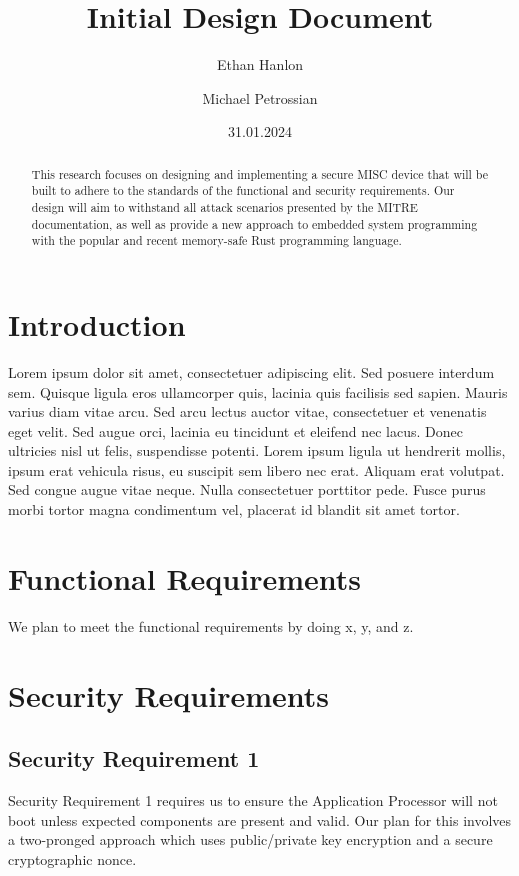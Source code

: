 \documentclass{prace}
\title{Initial Design Document}
\date{31.01.2024}
\author[1]{Ethan Hanlon}
\author[1]{Michael Petrossian}
\affiliation{San Francisco State University, 1600 Holloway Avenue, San Francisco, CA 94132, USA}
\begin{document}
\maketitle

\begin{abstract}
This research focuses on designing and implementing a secure MISC device that will be built to adhere to the standards of the functional and security requirements. Our design will 
aim to withstand all attack scenarios presented by the MITRE documentation, as well as provide a new approach to embedded system programming with the popular and recent memory-safe Rust programming language. 
\end{abstract}

\section{Introduction}

Lorem ipsum dolor sit amet, consectetuer adipiscing elit. Sed posuere interdum
sem. Quisque ligula eros ullamcorper quis, lacinia quis facilisis sed sapien.
Mauris varius diam vitae arcu. Sed arcu lectus auctor vitae, consectetuer et
venenatis eget velit. Sed augue orci, lacinia eu tincidunt et eleifend nec
lacus. Donec ultricies nisl ut felis, suspendisse potenti. Lorem ipsum ligula
ut hendrerit mollis, ipsum erat vehicula risus, eu suscipit sem libero nec
erat. Aliquam erat volutpat. Sed congue augue vitae neque. Nulla consectetuer
porttitor pede. Fusce purus morbi tortor magna condimentum vel, placerat id
blandit sit amet tortor.


\section{Functional Requirements}

We plan to meet the functional requirements by doing x, y, and z.

\section{Security Requirements}

\subsection{Security Requirement 1}
Security Requirement 1 requires us to ensure the Application Processor will not boot unless
expected components are present and valid. Our plan for this involves a two-pronged approach
which uses public/private key encryption and a secure cryptographic nonce.
\end{document}
